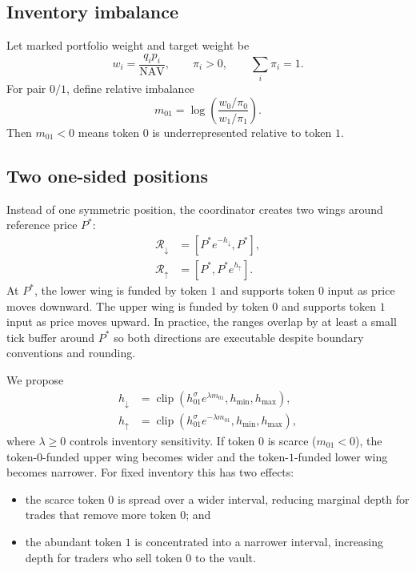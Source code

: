 \documentclass[11pt]{article}
\newcommand{\nav}{\mathrm{NAV}}
\begin{document}
\subsection{Inventory imbalance}

Let marked portfolio weight and target weight be
\begin{equation}
  w_i=\frac{q_i p_i}{\nav},\qquad \pi_i>0,\qquad \sum_i\pi_i=1.
\end{equation}
For pair $0/1$, define relative imbalance
\begin{equation}
  m_{01}=\log\left(\frac{w_0/\pi_0}{w_1/\pi_1}\right).
  \label{eq:imbalance}
\end{equation}
Then $m_{01}<0$ means token $0$ is underrepresented relative to token $1$.

\subsection{Two one-sided positions}

Instead of one symmetric position, the coordinator creates two wings around
reference price $P^*$:
\begin{align}
  \mathcal{R}_{\downarrow} &= [P^*e^{-h_{\downarrow}},P^*],\\
  \mathcal{R}_{\uparrow} &= [P^*,P^*e^{h_{\uparrow}}].
  \label{eq:wings}
\end{align}
At $P^*$, the lower wing is funded by token $1$ and supports token $0$ input as
price moves downward. The upper wing is funded by token $0$ and supports token
$1$ input as price moves upward. In practice, the ranges overlap by at least a
small tick buffer around $P^*$ so both directions are executable despite
boundary conventions and rounding.

We propose
\begin{align}
  h_{\downarrow} &= \operatorname{clip}
  \left(h_{01}^{\sigma}e^{\lambda m_{01}},h_{\min},h_{\max}\right),\\
  h_{\uparrow} &= \operatorname{clip}
  \left(h_{01}^{\sigma}e^{-\lambda m_{01}},h_{\min},h_{\max}\right),
  \label{eq:asymwidth}
\end{align}
where $\lambda\ge 0$ controls inventory sensitivity. If token $0$ is scarce
($m_{01}<0$), the token-$0$-funded upper wing becomes wider and the
token-$1$-funded lower wing becomes narrower. For fixed inventory this has two
effects:

\begin{itemize}
  \item the scarce token $0$ is spread over a wider interval, reducing marginal
        depth for trades that remove more token $0$; and
  \item the abundant token $1$ is concentrated into a narrower interval,
        increasing depth for traders who sell token $0$ to the vault.
\end{itemize}
\end{document}
